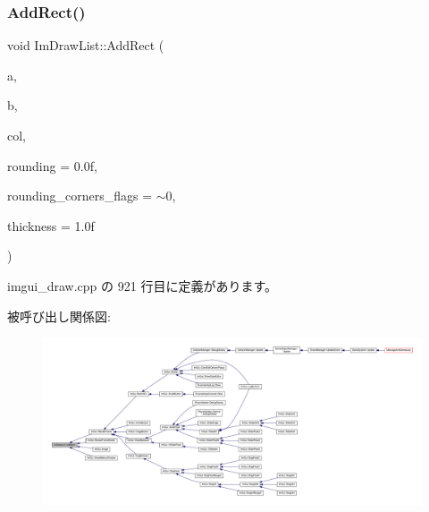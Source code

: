 \mbox{\label{struct_im_draw_list_a6738c7d0b696273a37808554e1f15a0a}} 
\subsubsection{\texorpdfstring{Add\+Rect()}{AddRect()}}
{\footnotesize\ttfamily void Im\+Draw\+List\+::\+Add\+Rect (\begin{DoxyParamCaption}\item[{const \mbox{\hyperlink{struct_im_vec2}{Im\+Vec2}} \&}]{a,  }\item[{const \mbox{\hyperlink{struct_im_vec2}{Im\+Vec2}} \&}]{b,  }\item[{\mbox{\hyperlink{imgui_8h_a118cff4eeb8d00e7d07ce3d6460eed36}{Im\+U32}}}]{col,  }\item[{float}]{rounding = {\ttfamily 0.0f},  }\item[{int}]{rounding\+\_\+corners\+\_\+flags = {\ttfamily $\sim$0},  }\item[{float}]{thickness = {\ttfamily 1.0f} }\end{DoxyParamCaption})}



 imgui\+\_\+draw.\+cpp の 921 行目に定義があります。

被呼び出し関係図\+:
\nopagebreak
\begin{figure}[H]
\begin{center}
\leavevmode
\includegraphics[width=350pt]{struct_im_draw_list_a6738c7d0b696273a37808554e1f15a0a_icgraph}
\end{center}
\end{figure}
\mbox{\label{struct_im_draw_list_a1fa7c9165958909bba53c9740a607872}} 

